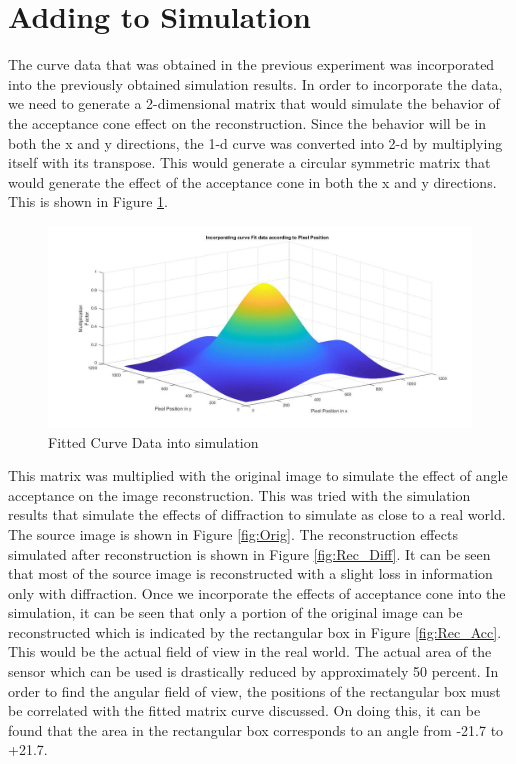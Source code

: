 \section{Adding to Simulation}
The curve data that was obtained in the previous experiment was incorporated into the previously obtained simulation results. In order to incorporate the data, we need to generate a 2-dimensional matrix that would simulate the behavior of the acceptance cone effect on the reconstruction. Since the behavior will be in both the x and y directions, the 1-d curve was converted into 2-d by multiplying itself with its transpose. This would generate a circular symmetric matrix that would generate the effect of the acceptance cone in both the x and y directions. This is shown in Figure \ref{fig:curve_sim}.
\begin{figure}[!h]
\centering
\includegraphics[width = \linewidth]{pics/AcceptanceConeCurveFit.jpg}
\caption{Fitted Curve Data into simulation}
\label{fig:curve_sim}
\end{figure}
This matrix was multiplied with the original image to simulate the effect of angle acceptance on the image reconstruction. This was tried with the simulation results that simulate the effects of diffraction to simulate as close to a real world. The source image is shown in Figure \ref{fig:Orig}. The reconstruction effects simulated after reconstruction is shown in Figure \ref{fig:Rec_Diff}. It can be seen that most of the source image is reconstructed with a slight loss in information only with diffraction. Once we incorporate the effects of acceptance cone into the simulation, it can be seen that only a portion of the original image can be reconstructed which is indicated by the rectangular box in Figure \ref{fig:Rec_Acc}. 
This would be the actual field of view in the real world. The actual area of the sensor which can be used is drastically reduced by approximately 50 percent. In order to find the angular field of view, the positions of the rectangular box must be correlated with the fitted matrix curve discussed. On doing this, it can be found that the area in the rectangular box corresponds to an angle from -21.7 to +21.7.

